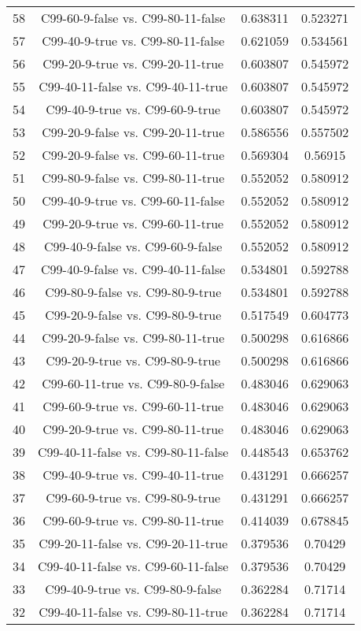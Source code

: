 \documentclass[a4paper,10pt]{article}
\begin{document}
\begin{landscape}
\begin{table}[!htp]
\begin{tabular}{cccc}
58&C99-60-9-false vs. C99-80-11-false&0.638311&0.523271\\
57&C99-40-9-true vs. C99-80-11-false&0.621059&0.534561\\
56&C99-20-9-true vs. C99-20-11-true&0.603807&0.545972\\
55&C99-40-11-false vs. C99-40-11-true&0.603807&0.545972\\
54&C99-40-9-true vs. C99-60-9-true&0.603807&0.545972\\
53&C99-20-9-false vs. C99-20-11-true&0.586556&0.557502\\
52&C99-20-9-false vs. C99-60-11-true&0.569304&0.56915\\
51&C99-80-9-false vs. C99-80-11-true&0.552052&0.580912\\
50&C99-40-9-true vs. C99-60-11-false&0.552052&0.580912\\
49&C99-20-9-true vs. C99-60-11-true&0.552052&0.580912\\
48&C99-40-9-false vs. C99-60-9-false&0.552052&0.580912\\
47&C99-40-9-false vs. C99-40-11-false&0.534801&0.592788\\
46&C99-80-9-false vs. C99-80-9-true&0.534801&0.592788\\
45&C99-20-9-false vs. C99-80-9-true&0.517549&0.604773\\
44&C99-20-9-false vs. C99-80-11-true&0.500298&0.616866\\
43&C99-20-9-true vs. C99-80-9-true&0.500298&0.616866\\
42&C99-60-11-true vs. C99-80-9-false&0.483046&0.629063\\
41&C99-60-9-true vs. C99-60-11-true&0.483046&0.629063\\
40&C99-20-9-true vs. C99-80-11-true&0.483046&0.629063\\
39&C99-40-11-false vs. C99-80-11-false&0.448543&0.653762\\
38&C99-40-9-true vs. C99-40-11-true&0.431291&0.666257\\
37&C99-60-9-true vs. C99-80-9-true&0.431291&0.666257\\
36&C99-60-9-true vs. C99-80-11-true&0.414039&0.678845\\
35&C99-20-11-false vs. C99-20-11-true&0.379536&0.70429\\
34&C99-40-11-false vs. C99-60-11-false&0.379536&0.70429\\
33&C99-40-9-true vs. C99-80-9-false&0.362284&0.71714\\
32&C99-40-11-false vs. C99-80-11-true&0.362284&0.71714\\

\end{tabular}
\end{table}
\end{landscape}
\end{document}
